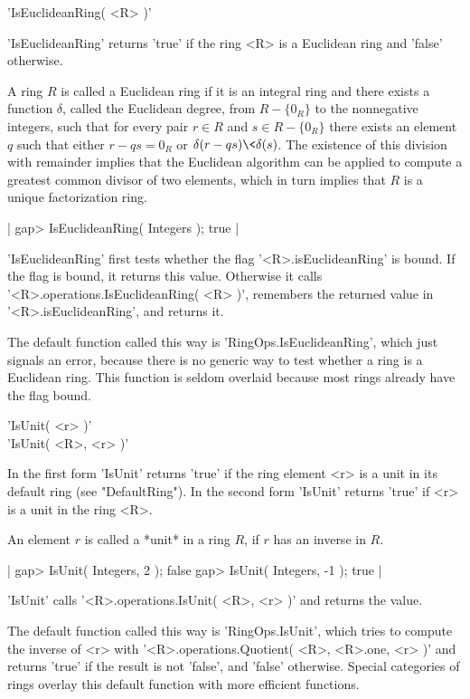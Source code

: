 
'IsEuclideanRing( <R> )'

'IsEuclideanRing' returns 'true' if the ring  <R> is a Euclidean ring and
'false' otherwise.

A ring $R$ is called a Euclidean ring if it is an integral ring and there
exists a function $\delta$, called the Euclidean degree, from $R-\{0_R\}$
to the nonnegative integers,  such  that for  every pair $r \in R$ and $s
\in  R-\{0_R\}$ there  exists an element $q$ such  that either $r - q s =
0_R$ or $\delta(r - q s) \< \delta( s )$.  The existence of this division
with remainder implies that  the Euclidean algorithm  can  be  applied to
compute a greatest common divisor of two elements, which in turn  implies
that $R$ is a unique factorization ring.

|    gap> IsEuclideanRing( Integers );
    true |

'IsEuclideanRing' first  tests whether the flag '<R>.isEuclideanRing'  is
bound.  If the flag is bound, it returns this value.   Otherwise it calls
'<R>.operations.IsEuclideanRing(  <R> )', remembers the returned value in
'<R>.isEuclideanRing', and returns it.

The default function called  this way is 'RingOps.IsEuclideanRing', which
just signals an  error, because there is no generic way to test whether a
ring is a Euclidean ring.  This function is seldom overlaid because  most
rings already have the flag bound.


'IsUnit( <r> )'\\
'IsUnit( <R>, <r> )'

In the first form  'IsUnit'  returns 'true' if the  ring element <r> is a
unit in  its default  ring   (see  "DefaultRing").   In  the  second form
'IsUnit' returns 'true' if <r> is a unit in the ring <R>.

An element $r$ is called a *unit* in a ring $R$, if $r$ has an inverse in
$R$.

|    gap> IsUnit( Integers, 2 );
    false
    gap> IsUnit( Integers, -1 );
    true |

'IsUnit' calls '<R>.operations.IsUnit( <R>, <r> )' and returns the value.

The default function called this way is 'RingOps.IsUnit', which  tries to
compute the inverse of  <r> with '<R>.operations.Quotient(  <R>, <R>.one,
<r>  )' and returns  'true' if  the result  is not  'false',  and 'false'
otherwise.   Special categories   of rings overlay this  default function
with more efficient functions.

